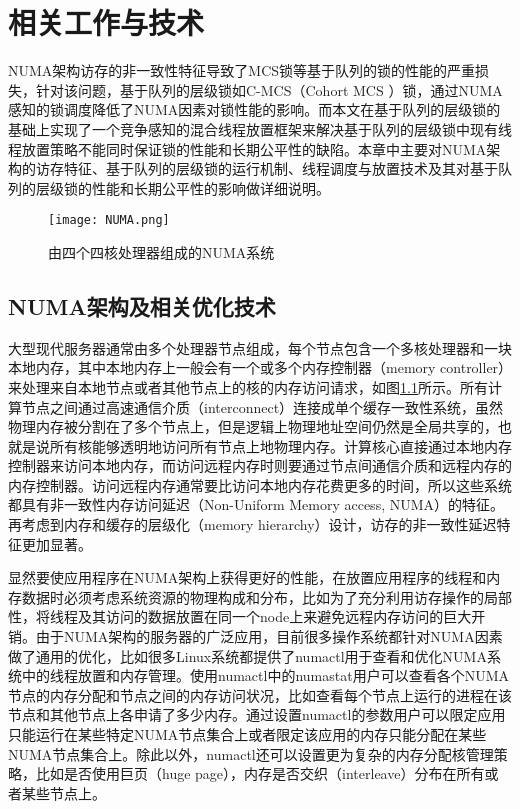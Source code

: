 
\chapter{相关工作与技术}
\label{chap:example}
NUMA架构访存的非一致性特征导致了MCS锁等基于队列的锁的性能的严重损失，针对该问题，基于队列的层级锁如C-MCS（Cohort MCS ）锁，通过NUMA感知的锁调度降低了NUMA因素对锁性能的影响。而本文在基于队列的层级锁的基础上实现了一个竞争感知的混合线程放置框架来解决基于队列的层级锁中现有线程放置策略不能同时保证锁的性能和长期公平性的缺陷。本章中主要对NUMA架构的访存特征、基于队列的层级锁的运行机制、线程调度与放置技术及其对基于队列的层级锁的性能和长期公平性的影响做详细说明。
\begin{figure}[t]
	\centering
	\texttt{[image: NUMA.png]}
	\caption{由四个四核处理器组成的NUMA系统}
	\label{Fig:numa}
\end{figure}
\section{NUMA架构及相关优化技术}

大型现代服务器通常由多个处理器节点组成，每个节点包含一个多核处理器和一块本地内存，其中本地内存上一般会有一个或多个内存控制器（memory controller）来处理来自本地节点或者其他节点上的核的内存访问请求，如图\ref{Fig:numa}所示。所有计算节点之间通过高速通信介质（interconnect）连接成单个缓存一致性系统，虽然物理内存被分割在了多个节点上，但是逻辑上物理地址空间仍然是全局共享的，也就是说所有核能够透明地访问所有节点上地物理内存。计算核心直接通过本地内存控制器来访问本地内存，而访问远程内存时则要通过节点间通信介质和远程内存的内存控制器。访问远程内存通常要比访问本地内存花费更多的时间，所以这些系统都具有非一致性内存访问延迟（Non-Uniform Memory access, NUMA）的特征。再考虑到内存和缓存的层级化（memory hierarchy）设计，访存的非一致性延迟特征更加显著。

显然要使应用程序在NUMA架构上获得更好的性能，在放置应用程序的线程和内存数据时必须考虑系统资源的物理构成和分布，比如为了充分利用访存操作的局部性，将线程及其访问的数据放置在同一个node上来避免远程内存访问的巨大开销。由于NUMA架构的服务器的广泛应用，目前很多操作系统都针对NUMA因素做了通用的优化，比如很多Linux系统都提供了numactl用于查看和优化NUMA系统中的线程放置和内存管理。使用numactl中的numastat用户可以查看各个NUMA节点的内存分配和节点之间的内存访问状况，比如查看每个节点上运行的进程在该节点和其他节点上各申请了多少内存。通过设置numactl的参数用户可以限定应用只能运行在某些特定NUMA节点集合上或者限定该应用的内存只能分配在某些NUMA节点集合上。除此以外，numactl还可以设置更为复杂的内存分配核管理策略，比如是否使用巨页（huge page），内存是否交织（interleave）分布在所有或者某些节点上。

